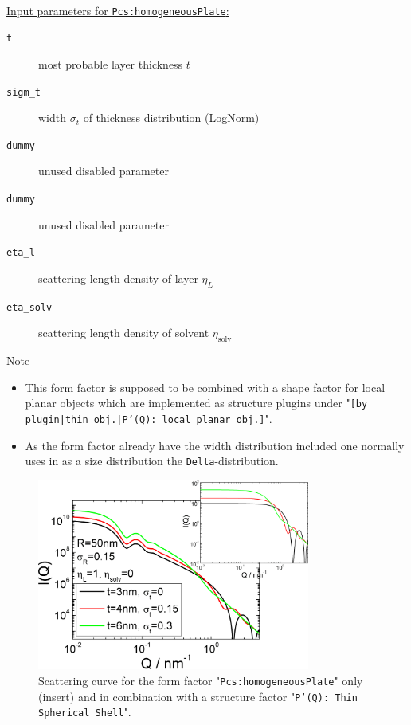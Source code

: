 \hspace{1pt}\\
\uline{Input parameters for \texttt{Pcs:homogeneousPlate}:}
\begin{description}
    \item[\texttt{t}] most probable layer thickness $t$
    \item[\texttt{sigm\_t}] width $\sigma_t$ of thickness distribution (LogNorm)
    \item[\texttt{dummy}] unused disabled parameter
    \item[\texttt{dummy}] unused disabled parameter
    \item[\texttt{eta\_l}] scattering length density of layer $\eta_L$
    \item[\texttt{eta\_solv}] scattering length density of solvent $\eta_\textrm{solv}$
\end{description}

\noindent
\uline{Note}
\begin{itemize}
  \item This form factor is supposed to be combined with a shape factor for
local planar objects which are implemented as structure  plugins
under "\texttt{[by plugin|thin obj.|P'(Q): local planar
obj.]}".
\item As the form factor already have the width distribution included one normally uses in \SASfit as a size distribution
the \texttt{Delta}-distribution.
\end{itemize}

\begin{figure}[htb]
\begin{center}
\includegraphics[width=0.8\textwidth,height=0.55\textwidth]{../images/form_factor/anisotropic/localplanarIQ.png}
\end{center}
\caption{Scattering curve for the form factor "\texttt{Pcs:homogeneousPlate}" only (insert) and
in combination with a structure factor "\texttt{P'(Q): Thin Spherical Shell}".}
\label{fig_IQ:homogeneousXS}
\end{figure}


